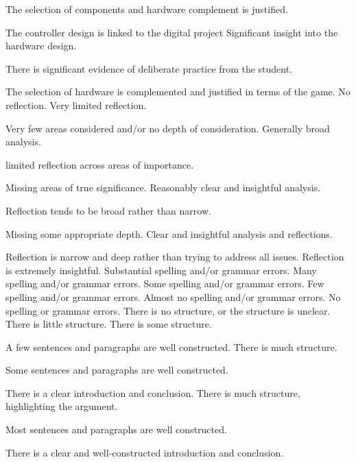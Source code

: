 \documentclass{../../fal_assignment}
\begin{document}
\begin{markingrubric}
	\par The selection of components and hardware complement is justified.
	\par The controller design is linked to the digital project
	\grade Significant insight into the hardware design.
	\par There is significant evidence of deliberate practice from the student.
	\par The selection of hardware is complemented and justified in terms of the game.
	\grade\fail 	No reflection.
	\grade 		Very limited reflection.
	\par Very few areas considered and/or no depth of consideration.
	\grade 		Generally broad analysis.  
	\par limited reflection across areas of importance.
	\par Missing areas of true significance. 
	\grade 		Reasonably clear and insightful analysis.
	\par Reflection tends to be broad rather than narrow.
	\par Missing some appropriate depth. 
	\grade 		Clear and insightful analysis and reflections.
	\par Reflection is narrow and deep rather than trying to address all issues.
	\grade 		Reflection is extremely insightful.
	\grade\fail 	Substantial spelling and/or grammar errors.
	\grade 		Many spelling and/or grammar errors.
	\grade 		Some spelling and/or grammar errors.  
	\grade 		Few spelling and/or grammar errors.
	\grade 		Almost no spelling and/or grammar errors.
	\grade 		No spelling or grammar errors.
    \grade\fail 	There is no structure, or the structure is unclear.
	\grade 		There is little structure.
	\grade 		There is some structure.
	\par 		A few sentences and paragraphs are well constructed.
	\grade 		There is much structure.
	\par 		Some sentences and paragraphs are well constructed.
	\par 		There is a clear introduction and conclusion.
	\grade 		There is much structure, highlighting the argument.
	\par 		Most sentences and paragraphs are well constructed.
	\par 		There is a clear and well-constructed introduction and conclusion.

\end{markingrubric}
\end{document}
